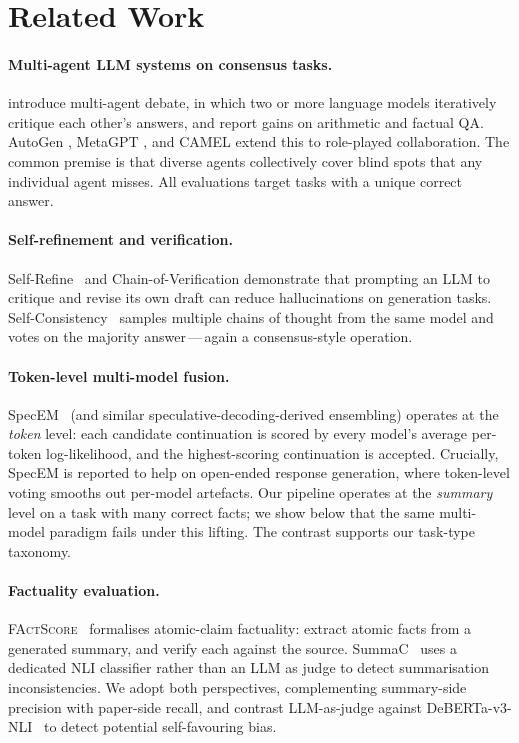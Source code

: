 \documentclass[11pt,a4paper]{article}
\begin{document}
\section{Related Work}
\label{sec:related}

\paragraph{Multi-agent LLM systems on consensus tasks.}
\citet{du2023improving} introduce multi-agent debate, in which two or
more language models iteratively critique each other's answers, and
report gains on arithmetic and factual QA. AutoGen
\citep{wu2023autogen}, MetaGPT \citep{hong2023metagpt}, and CAMEL
\citep{li2023camel} extend this to role-played collaboration. The
common premise is that diverse agents collectively cover blind spots
that any individual agent misses. All evaluations target tasks with
a unique correct answer.

\paragraph{Self-refinement and verification.}
Self-Refine~\cite{madaan2023selfrefine} and Chain-of-Verification
\citep{dhuliawala2023chainofverification} demonstrate that prompting an
LLM to critique and revise its own draft can reduce hallucinations on
generation tasks. Self-Consistency~\cite{wang2022selfconsistency} samples
multiple chains of thought from the same model and votes on the
majority answer\,---\,again a consensus-style operation.

\paragraph{Token-level multi-model fusion.}
SpecEM~\cite{specem2024} (and similar speculative-decoding-derived
ensembling) operates at the \emph{token} level: each candidate
continuation is scored by every model's average per-token log-likelihood,
and the highest-scoring continuation is accepted.
Crucially, SpecEM is reported to help on open-ended response generation,
where token-level voting smooths out per-model artefacts. Our
pipeline operates at the \emph{summary} level on a task with many
correct facts; we show below that the same multi-model paradigm fails
under this lifting. The contrast supports our task-type taxonomy.

\paragraph{Factuality evaluation.}
\textsc{FActScore}~\cite{min2023factscore} formalises atomic-claim
factuality: extract atomic facts from a generated summary, and verify
each against the source. SummaC~\cite{laban2022summac} uses a dedicated
NLI classifier rather than an LLM as judge to detect summarisation
inconsistencies. We adopt both perspectives, complementing summary-side
precision with paper-side recall, and contrast LLM-as-judge against
DeBERTa-v3-NLI~\cite{he2021debertav3} to detect potential
self-favouring bias.
\end{document}
